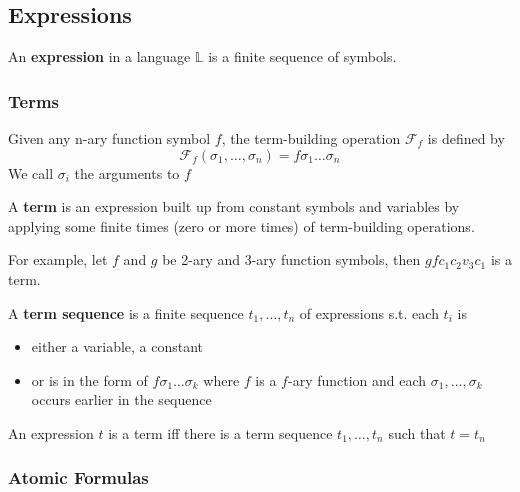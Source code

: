 \subsection{Expressions}

An \textbf{expression} in a language $\mathbb{L}$ is a finite sequence of symbols.

\subsubsection{Terms}

\begin{definition}
    \label{def:TermBuildingOperation}
    Given any n-ary function symbol $f$, the term-building operation $\mathcal{F}_f$ is defined by
    \[ \mathcal{F}_f (\sigma_1,\dots,\sigma_n) = f \sigma_1\dots\sigma_n \]
    We call $\sigma_i$ the arguments to $f$
\end{definition}

\begin{definition}[Term]
    \label{def:Term}
    A \textbf{term} is an expression built up from constant symbols and variables by applying some finite times (zero or more times) of term-building operations.
\end{definition}

For example, let $f$ and $g$ be 2-ary and 3-ary function symbols, then $gfc_1c_2v_3c_1$ is a term.

\begin{definition}
    \label{def:TermSequence}
    A \textbf{term sequence} is a finite sequence $t_1,\dots,t_n$ of expressions s.t. each $t_i$ is
    \begin{itemize}
        \item either a variable, a constant
        \item or is in the form of $f\sigma_1\dots\sigma_k$ where $f$ is a $f$-ary function and each $\sigma_1,\dots,\sigma_k$ occurs earlier in the sequence
    \end{itemize}
\end{definition}

\begin{proposition}
    An expression $t$ is a term iff there is a term sequence $t_1,\dots,t_n$ such that $t=t_n$
\end{proposition}

\subsubsection{Atomic Formulas}

